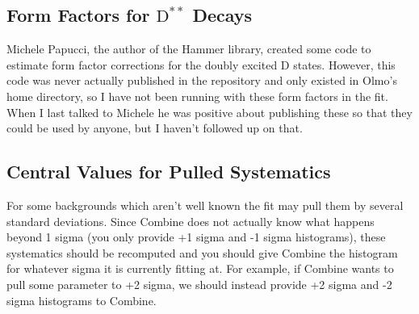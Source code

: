 \documentclass[12pt]{report}
\begin{document}
\subsection{Form Factors for $\mathrm{D}^{**}$ Decays}
Michele Papucci, the author of the Hammer library, created some code to
estimate form factor corrections for the doubly excited D states. However, this
code was never actually published in the repository and only existed in Olmo's
home directory, so I have not been running with these form factors in the fit.
When I last talked to Michele he was positive about publishing these so that
they could be used by anyone, but I haven't followed up on that.
\subsection{Central Values for Pulled Systematics}
For some backgrounds which aren't well known the fit may pull them by several
standard deviations. Since Combine does not actually know what happens beyond 1
sigma (you only provide +1 sigma and -1 sigma histograms), these systematics
should be recomputed and you should give Combine the histogram for whatever
sigma it is currently fitting at. For example, if Combine wants to pull some
parameter to +2 sigma, we should instead provide +2 sigma and -2 sigma
histograms to Combine.
\end{document}
